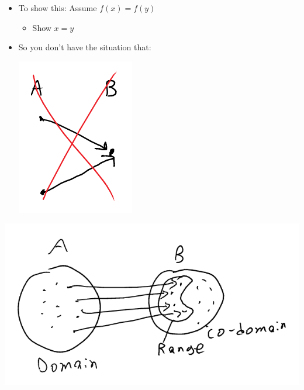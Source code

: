 \documentclass[11pt]{article}
\begin{document}
\begin{enumerate}
\begin{enumerate}
\begin{itemize}
\begin{itemize}
\item To show this: Assume \(f(x)=f(y)\)
\begin{itemize}
\item Show \(x=y\)
\end{itemize}
\item So you don't have the situation that: \begin{center}
\includegraphics[width=.9\linewidth]{./Images/i3.png}
\end{center}
\end{itemize}
\end{itemize}

\begin{center}
\includegraphics[width=.9\linewidth]{./Images/i4.png}
\end{center} 


\end{enumerate}
\end{enumerate}
\end{document}
